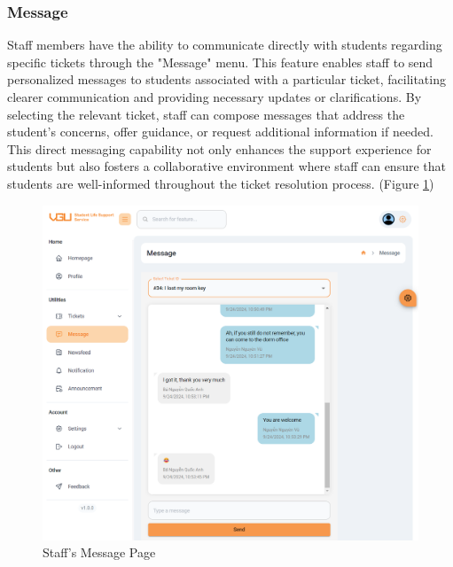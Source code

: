 	\subsubsection{Message}
	Staff members have the ability to communicate directly with students regarding specific tickets through the "Message" menu. This feature enables staff to send personalized messages to students associated with a particular ticket, facilitating clearer communication and providing necessary updates or clarifications. By selecting the relevant ticket, staff can compose messages that address the student's concerns, offer guidance, or request additional information if needed. This direct messaging capability not only enhances the support experience for students but also fosters a collaborative environment where staff can ensure that students are well-informed throughout the ticket resolution process. (Figure \ref{fig:gui-st-message})
	\begin{figure}[H]
		\centering
		\includegraphics[width=1\linewidth]{graphics/gui/staff/message}
		\caption{Staff's Message Page}
		\label{fig:gui-st-message}
	\end{figure}
	
